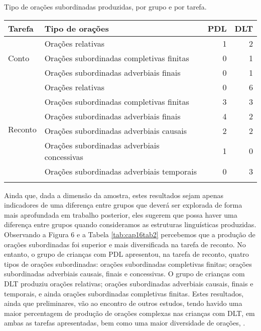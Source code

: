 \documentclass[output=paper,colorlinks,citecolor=brown,booklanguage=portuguese]{langscibook}
\begin{document}
\begin{Tabela}
    \caption{{Tipo de orações subordinadas produzidas, por grupo e por tarefa.}}
    \label{tab:cap16tab2}

    \begin{tabular}{llrr}
    \lsptoprule
 \textbf{Tarefa}	&\textbf{Tipo de orações}	&\textbf{PDL}&	\textbf{DLT}\\
 \midrule
 & Orações relativas &1 &2\\
 Conto	&Orações subordinadas completivas finitas&	0&	1\\
&	Orações subordinadas adverbiais finais&	0&	1\\
\midrule
\multirow{6}{*}{Reconto}&	Orações relativas&	0&	6\\
&	Orações subordinadas completivas finitas&	3&	3\\
&	Orações subordinadas adverbiais finais	&4	&2\\
&	Orações subordinadas adverbiais causais	&2	&2\\
&	Orações subordinadas adverbiais concessivas&	1&	0\\
&	Orações subordinadas adverbiais temporais	&0	&3\\
\lspbottomrule
    \end{tabular}
    \label{tab:my_label}
\end{Tabela}

Ainda que, dada a dimensão da amostra, estes resultados sejam apenas indicadores de uma diferença entre grupos que deverá ser explorada de forma mais aprofundada em trabalho posterior, eles sugerem que possa haver uma diferença entre grupos quando consideramos as estruturas linguísticas produzidas. Observando a Figura 6 e a Tabela \ref{tab:cap16tab2} percebemos que a produção de orações subordinadas foi superior e mais diversificada na tarefa de reconto. No entanto, o grupo de crianças com PDL apresentou, na tarefa de reconto, quatro tipos de orações subordinadas: orações subordinadas completivas finitas; orações subordinadas adverbiais causais, finais e concessivas. O grupo de crianças com DLT produziu orações relativas; orações subordinadas adverbiais causais, finais e temporais, e ainda orações subordinadas completivas finitas. Estes resultados, ainda que preliminares, vão ao encontro de outros estudos, tendo havido uma maior percentagem de produção de orações complexas nas crianças com DLT, em ambas as tarefas apresentadas, bem como uma maior diversidade de orações, \citep{Gillam1992, Fey2004, Cunha2013, Monteiro2016, Gillam2018}. 
\end{document}

